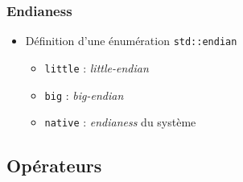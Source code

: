 \documentclass[C++.tex]{subfiles}
\begin{document}
\begin{frame}[fragile]
	\frametitle{Endianess}
	\begin{itemize}
		\item Définition d'une énumération \lstinline|std::endian|
		\begin{itemize}
			\item \lstinline|little| : \textit{little-endian}
			\item \lstinline|big| : \textit{big-endian}
			\item \lstinline|native| : \textit{endianess} du système
		\end{itemize}
	\end{itemize}
\end{frame}

\subsection*{Opérateurs}
\end{document}
